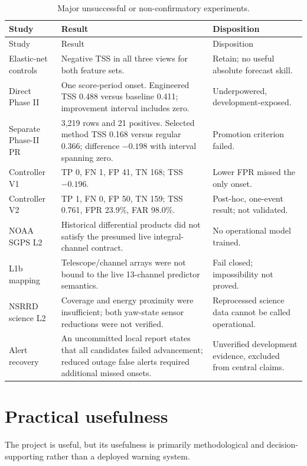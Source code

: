 \documentclass[11pt]{article}
\begin{document}
\begin{longtable}{p{}p{}p{}}
\caption{Major unsuccessful or non-confirmatory experiments.}\\
\toprule
Study & Result & Disposition\\
\midrule
\endfirsthead
\toprule
Study & Result & Disposition\\
\midrule
\endhead
Elastic-net controls & Negative TSS in all three views for both feature sets. & Retain; no useful absolute forecast skill.\\
Direct Phase II & One score-period onset. Engineered TSS 0.488 versus baseline 0.411; improvement interval includes zero. & Underpowered, development-exposed.\\
Separate Phase-II PR & 3,219 rows and 21 positives. Selected method TSS 0.168 versus regular 0.366; difference $-0.198$ with interval spanning zero. & Promotion criterion failed.\\
Controller V1 & TP 0, FN 1, FP 41, TN 168; TSS $-0.196$. & Lower FPR missed the only onset.\\
Controller V2 & TP 1, FN 0, FP 50, TN 159; TSS 0.761, FPR 23.9\%, FAR 98.0\%. & Post-hoc, one-event result; not validated.\\
NOAA SGPS L2 & Historical differential products did not satisfy the presumed live integral-channel contract. & No operational model trained.\\
L1b mapping & Telescope/channel arrays were not bound to the live 13-channel predictor semantics. & Fail closed; impossibility not proved.\\
NSRRD science L2 & Coverage and energy proximity were insufficient; both yaw-state sensor reductions were not verified. & Reprocessed science data cannot be called operational.\\
Alert recovery & An uncommitted local report states that all candidates failed advancement; reduced outage false alerts required additional missed onsets. & Unverified development evidence, excluded from central claims.\\
\bottomrule
\end{longtable}

\section{Practical usefulness}

The project is useful, but its usefulness is primarily methodological and decision-supporting rather than a deployed warning system.
\end{document}
